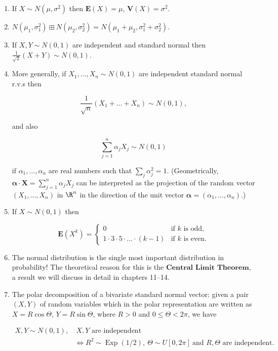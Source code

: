 \begin{enumerate}[label=\arabic*.]
\item If $X\sim N(\mu,\sigma^2)$ then $\mathbf{E}(X)=\mu$,
$\mathbf{V}(X) =\sigma^2$.

\item $N(\mu_1,\sigma_1^2) \boxplus N(\mu_2,\sigma_2^2) =
N(\mu_1+\mu_2,\sigma_1^2+\sigma_2^2)$.

\item If $X,Y\sim N(0,1)$ are independent and standard
normal then $\frac{1}{\sqrt{2}}(X+Y) \sim N(0,1)$.

\item More generally, if $X_1,\ldots,X_n \sim N(0,1)$ are
independent standard normal r.v.s then

\[
\frac{1}{\sqrt{n}}(X_1+\ldots+X_n) \sim N(0,1),
\]

\noindent and also

\[
\sum_{j=1}^n \alpha_j X_j \sim N(0,1)
\]

\noindent if $\alpha_1,\ldots,\alpha_n$ are real numbers such
that $\sum_j \alpha_j^2 = 1$. (Geometrically,
$\mathbf{\alpha}\cdot \mathbf{X} = \sum_{j=1}^n
\alpha_j X_j$
can be interpreted as the projection of the random
vector $(X_1,\ldots,X_n)$ in $\R^n$ in the direction
of the unit vector
$\mathbf{\alpha}=(\alpha_1,\ldots,\alpha_n)$.)

\item If $X\sim N(0,1)$ then

\[
\mathbf{E}(X^k) = \begin{cases}
0 & \textrm{if } k \textrm{ is odd}, \\
1\cdot 3 \cdot 5 \cdot \ldots \cdot (k-1) & \textrm{if } k \textrm{ is even}.
\end{cases}
\]

\item The normal distribution is the single most important
distribution in probability! The theoretical reason
for this is the $\textbf{Central Limit Theorem}$, a
result we will discuss in detail in chapters 11--14.

\item The polar decomposition of a bivariate standard
normal vector: given a pair $(X,Y)$ of random
variables which in the polar representation are
written as $X=R\cos\Theta$, $Y=R\sin \Theta$, where
$R>0$ and $0\le \Theta<2\pi$, we have

\begin{align*}
X,Y\sim N(0,1), & \ X,Y\textrm{ are independent } \\
& \iff R^2 \sim \operatorname{Exp}(1/2), \ \Theta\sim U[0,2\pi]\ \textrm{and } R,\Theta \textrm{ are independent.}
\end{align*}
\end{enumerate}
